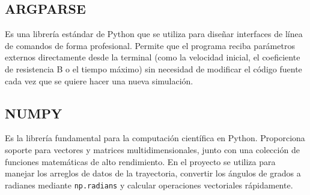 \documentclass{article}
\begin{document}
\subsection{ARGPARSE}
\label{sec:orga48e1da}
Es una librería estándar de Python que se utiliza para diseñar
interfaces de línea de comandos de forma profesional. Permite que el
programa reciba parámetros externos directamente desde la terminal
(como la velocidad inicial, el coeficiente de resistencia B o el
tiempo máximo) sin necesidad de modificar el código fuente cada vez
que se quiere hacer una nueva simulación.
\subsection{NUMPY}
\label{sec:org4577363}
Es la librería fundamental para la computación científica en
Python. Proporciona soporte para vectores y matrices
multidimensionales, junto con una colección de funciones matemáticas
de alto rendimiento. En el proyecto se utiliza para manejar los
arreglos de datos de la trayectoria, convertir los ángulos de grados
a radianes mediante \texttt{np.radians} y calcular operaciones vectoriales
rápidamente.
\end{document}
